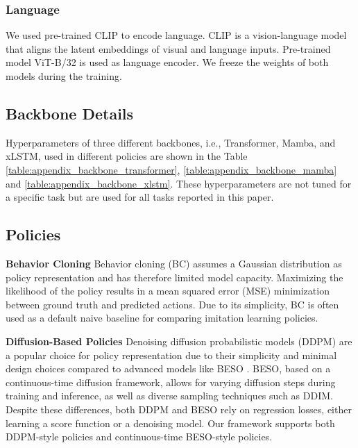 \subsubsection{Language}
We used pre-trained CLIP to encode language. CLIP is a vision-language model that aligns the latent embeddings of visual and language inputs. Pre-trained model ViT-B/32 is used as language encoder. We freeze the weights of both models during the training.

\subsection{Backbone Details}
Hyperparameters of three different backbones, i.e., Transformer, Mamba, and xLSTM, used in different policies are shown in the Table \ref{table:appendix_backbone_transformer}, \ref{table:appendix_backbone_mamba} and \ref{table:appendix_backbone_xlstm}. These hyperparameters are not tuned for a specific task but are used for all tasks reported in this paper.





\newpage


\subsection{Policies}
\label{appendix:policy}
\textbf{Behavior Cloning} Behavior cloning (BC) assumes a Gaussian distribution as policy representation and has therefore limited model capacity. Maximizing the likelihood of the policy results in a mean squared error (MSE) minimization between ground truth and predicted actions. Due to its simplicity, BC is often used as a default naive baseline for comparing imitation learning policies.  

\textbf{Diffusion-Based Policies}  
Denoising diffusion probabilistic models (DDPM) \cite{ho2020denoising} are a popular choice for policy representation due to their simplicity and minimal design choices compared to advanced models like BESO \cite{reuss2023goal}. BESO, based on a continuous-time diffusion framework, allows for varying diffusion steps during training and inference, as well as diverse sampling techniques such as DDIM. Despite these differences, both DDPM and BESO rely on regression losses, either learning a score function or a denoising model. Our framework supports both DDPM-style policies and continuous-time BESO-style policies.  

